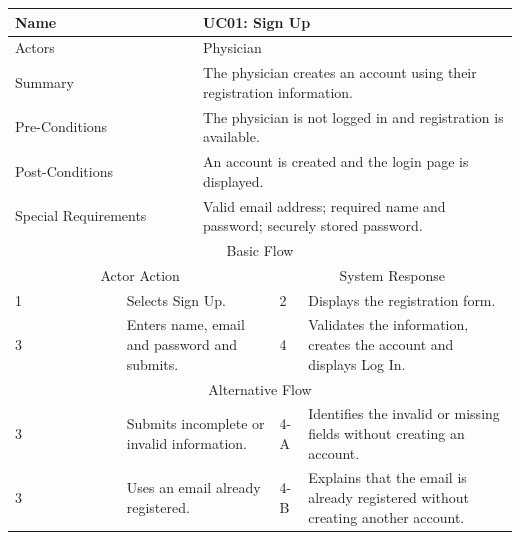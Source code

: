 \begin{reporttable}
\centering
\small
\caption{UC01: Sign Up.}
\label{tab:kashaf:uc01}
\begin{tabular}{|p{}|p{}|p{}|p{}|p{}|}
\hline
\multicolumn{2}{|p{\dimexpr0.225\textwidth+2\tabcolsep+\arrayrulewidth\relax}|}{Name} & \multicolumn{3}{p{\dimexpr0.575\textwidth+4\tabcolsep+2\arrayrulewidth\relax}|}{UC01: Sign Up} \\ \hline
\multicolumn{2}{|p{\dimexpr0.225\textwidth+2\tabcolsep+\arrayrulewidth\relax}|}{Actors} & \multicolumn{3}{p{\dimexpr0.575\textwidth+4\tabcolsep+2\arrayrulewidth\relax}|}{Physician} \\ \hline
\multicolumn{2}{|p{\dimexpr0.225\textwidth+2\tabcolsep+\arrayrulewidth\relax}|}{Summary} & \multicolumn{3}{p{\dimexpr0.575\textwidth+4\tabcolsep+2\arrayrulewidth\relax}|}{The physician creates an account using their registration information.} \\ \hline
\multicolumn{2}{|p{\dimexpr0.225\textwidth+2\tabcolsep+\arrayrulewidth\relax}|}{Pre-Conditions} & \multicolumn{3}{p{\dimexpr0.575\textwidth+4\tabcolsep+2\arrayrulewidth\relax}|}{The physician is not logged in and registration is available.} \\ \hline
\multicolumn{2}{|p{\dimexpr0.225\textwidth+2\tabcolsep+\arrayrulewidth\relax}|}{Post-Conditions} & \multicolumn{3}{p{\dimexpr0.575\textwidth+4\tabcolsep+2\arrayrulewidth\relax}|}{An account is created and the login page is displayed.} \\ \hline
\multicolumn{2}{|p{\dimexpr0.225\textwidth+2\tabcolsep+\arrayrulewidth\relax}|}{Special Requirements} & \multicolumn{3}{p{\dimexpr0.575\textwidth+4\tabcolsep+2\arrayrulewidth\relax}|}{Valid email address; required name and password; securely stored password.} \\ \hline
\multicolumn{5}{|c|}{Basic Flow} \\ \hline
\multicolumn{3}{|c|}{Actor Action} & \multicolumn{2}{c|}{System Response} \\ \hline
1 & \multicolumn{2}{p{\dimexpr0.37\textwidth+2\tabcolsep+\arrayrulewidth\relax}|}{Selects Sign Up.} & 2 & Displays the registration form. \\ \hline
3 & \multicolumn{2}{p{\dimexpr0.37\textwidth+2\tabcolsep+\arrayrulewidth\relax}|}{Enters name, email and password and submits.} & 4 & Validates the information, creates the account and displays Log In. \\ \hline
\multicolumn{5}{|c|}{Alternative Flow} \\ \hline
3 & \multicolumn{2}{p{\dimexpr0.37\textwidth+2\tabcolsep+\arrayrulewidth\relax}|}{Submits incomplete or invalid information.} & 4-A & Identifies the invalid or missing fields without creating an account. \\ \hline
3 & \multicolumn{2}{p{\dimexpr0.37\textwidth+2\tabcolsep+\arrayrulewidth\relax}|}{Uses an email already registered.} & 4-B & Explains that the email is already registered without creating another account. \\ \hline
\end{tabular}
\end{reporttable}

